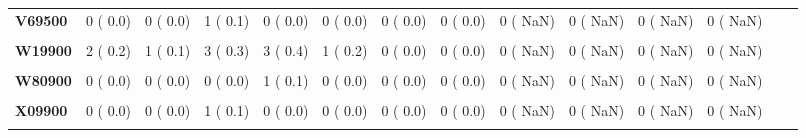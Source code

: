 \documentclass[
]{article}
\begin{document}
\begin{table}[H]
\begin{tabular}[t]{>{\raggedright\arraybackslash}p{5em}ccccccccccccc}
\textbf{V69500} & 0 (  0.0) & 0 (  0.0) & 1 (  0.1) & 0 (  0.0) & 0 (  0.0) & 0 (  0.0) & 0 (  0.0) & 0 (  NaN) & 0 (  NaN) & 0 (  NaN) & 0 (  NaN) &  & \\
\textbf{\cellcolor{gray!10}{V89200}} & \cellcolor{gray!10}{1 (  0.1)} & \cellcolor{gray!10}{1 (  0.1)} & \cellcolor{gray!10}{0 (  0.0)} & \cellcolor{gray!10}{0 (  0.0)} & \cellcolor{gray!10}{1 (  0.2)} & \cellcolor{gray!10}{0 (  0.0)} & \cellcolor{gray!10}{0 (  0.0)} & \cellcolor{gray!10}{0 (  NaN)} & \cellcolor{gray!10}{0 (  NaN)} & \cellcolor{gray!10}{0 (  NaN)} & \cellcolor{gray!10}{0 (  NaN)} & \cellcolor{gray!10}{} & \cellcolor{gray!10}{}\\
\textbf{W19900} & 2 (  0.2) & 1 (  0.1) & 3 (  0.3) & 3 (  0.4) & 1 (  0.2) & 0 (  0.0) & 0 (  0.0) & 0 (  NaN) & 0 (  NaN) & 0 (  NaN) & 0 (  NaN) &  & \\
\textbf{\cellcolor{gray!10}{W74900}} & \cellcolor{gray!10}{1 (  0.1)} & \cellcolor{gray!10}{0 (  0.0)} & \cellcolor{gray!10}{0 (  0.0)} & \cellcolor{gray!10}{1 (  0.1)} & \cellcolor{gray!10}{0 (  0.0)} & \cellcolor{gray!10}{0 (  0.0)} & \cellcolor{gray!10}{0 (  0.0)} & \cellcolor{gray!10}{0 (  NaN)} & \cellcolor{gray!10}{0 (  NaN)} & \cellcolor{gray!10}{0 (  NaN)} & \cellcolor{gray!10}{0 (  NaN)} & \cellcolor{gray!10}{} & \cellcolor{gray!10}{}\\
\textbf{W80900} & 0 (  0.0) & 0 (  0.0) & 0 (  0.0) & 1 (  0.1) & 0 (  0.0) & 0 (  0.0) & 0 (  0.0) & 0 (  NaN) & 0 (  NaN) & 0 (  NaN) & 0 (  NaN) &  & \\
\textbf{\cellcolor{gray!10}{W84900}} & \cellcolor{gray!10}{2 (  0.2)} & \cellcolor{gray!10}{2 (  0.2)} & \cellcolor{gray!10}{0 (  0.0)} & \cellcolor{gray!10}{0 (  0.0)} & \cellcolor{gray!10}{0 (  0.0)} & \cellcolor{gray!10}{1 (  0.4)} & \cellcolor{gray!10}{2 (  0.9)} & \cellcolor{gray!10}{0 (  NaN)} & \cellcolor{gray!10}{0 (  NaN)} & \cellcolor{gray!10}{0 (  NaN)} & \cellcolor{gray!10}{0 (  NaN)} & \cellcolor{gray!10}{} & \cellcolor{gray!10}{}\\
\textbf{X09900} & 0 (  0.0) & 0 (  0.0) & 1 (  0.1) & 0 (  0.0) & 0 (  0.0) & 0 (  0.0) & 0 (  0.0) & 0 (  NaN) & 0 (  NaN) & 0 (  NaN) & 0 (  NaN) &  & \\
\textbf{\cellcolor{gray!10}{X59900}} & \cellcolor{gray!10}{4 (  0.4)} & \cellcolor{gray!10}{7 (  0.7)} & \cellcolor{gray!10}{6 (  0.7)} & \cellcolor{gray!10}{5 (  0.7)} & \cellcolor{gray!10}{7 (  1.5)} & \cellcolor{gray!10}{0 (  0.0)} & \cellcolor{gray!10}{1 (  0.4)} & \cellcolor{gray!10}{0 (  NaN)} & \cellcolor{gray!10}{0 (  NaN)} & \cellcolor{gray!10}{0 (  NaN)} & \cellcolor{gray!10}{0 (  NaN)} & \cellcolor{gray!10}{} & \cellcolor{gray!10}{}\\

\end{tabular}
\end{table}
\end{document}
